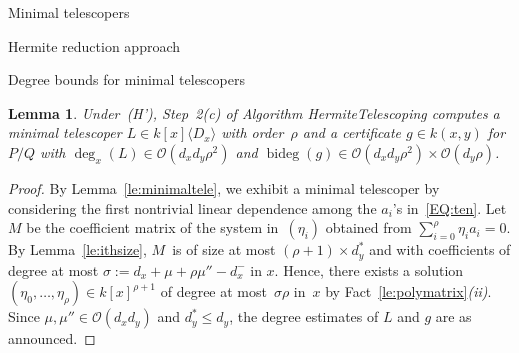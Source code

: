 \documentclass{sig-alt-full}
\newcommand{\bigO}{{\mathcal{O}}}
\newcommand{\bideg}{\operatorname{bideg}}
\newtheorem{lemma}{Lemma}
\begin{document}
\begin{section}{Minimal telescopers}
\begin{subsection}{Hermite reduction approach}
\begin{subsubsection}{Degree bounds for minimal telescopers}
\begin{lemma}
Under~(H'), Step~2(c) of Algorithm \textsf{Hermite\-Telescoping} computes
a minimal telescoper $L \in k[x]\langle D_x \rangle$ with order~$\rho$
and a certificate $g \in k(x, y)$ for $P/Q$ with $\deg_x(L)\in
\bigO(d_xd_y\rho^2) $ and $\bideg(g) \in \bigO(d_xd_y\rho^2) \times
\bigO(d_y\rho)$.
\end{lemma}

\begin{proof}
By Lemma~\ref{le:minimaltele}, we exhibit a minimal telescoper
by considering the first nontrivial linear dependence among the
$a_i$'s in~\eqref{EQ:ten}.
Let $M$ be the coefficient matrix of the system in~$(\eta_i)$
obtained from $\sum_{i=0}^{\rho}\eta_i a_i=0$.
By Lemma~\ref{le:ithsize}, $M$~is of size at most
$(\rho+1)\times d_y^*$ and with coefficients of degree at most
$\sigma := d_x+\mu+\rho \mu''-d_x^-$ in $x$.
Hence, there exists a solution
$(\eta_0, \dots, \eta_{\rho})\in k[x]^{\rho+1}$ of degree at
most~$\sigma\rho$ in~$x$ by
Fact~\ref{le:polymatrix}\emph{(ii)}.
Since $\mu, \mu''\in
\bigO(d_xd_y)$ and $d_y^*\le d_y$, the degree estimates of
$L$ and $g$ are as announced.
\end{proof}
\end{subsubsection}

\begin{figure}
\end{figure}
\end{subsection}
\end{section}
\end{document}
